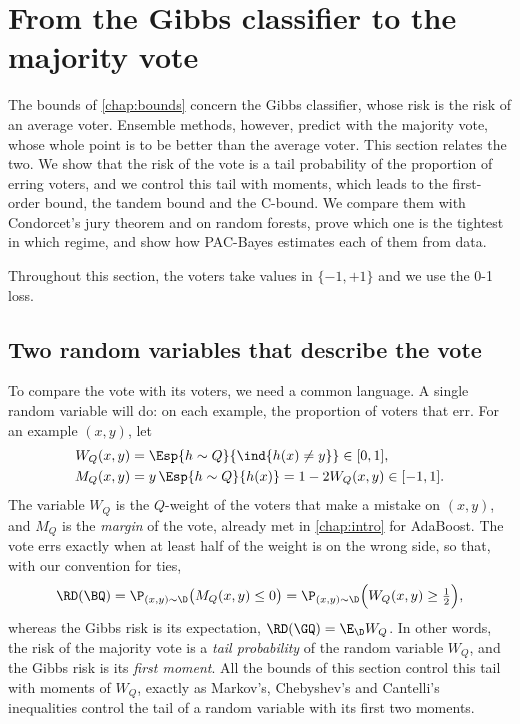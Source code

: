 \section{From the Gibbs classifier to the majority vote}
\label{chap:mv}

\begin{objectives}
The bounds of \cref{chap:bounds} concern the Gibbs classifier, whose risk is the
risk of an average voter. Ensemble methods, however, predict with the majority
vote, whose whole point is to be better than the average voter. This section
relates the two. We show that the risk of the vote is a tail probability of the
proportion of erring voters, and we control this tail with moments, which leads
to the first-order bound, the tandem bound and the C-bound. We compare them with
Condorcet's jury theorem and on random forests, prove which one is the tightest
in which regime, and show how PAC-Bayes estimates each of them from data.
\end{objectives}

Throughout this section, the voters take values in $\{-1,+1\}$ and we use the
0-1 loss.

\subsection{Two random variables that describe the vote}

To compare the vote with its voters, we need a common language. A single
random variable will do: on each example, the proportion of voters that err.
For an example $(x,y)$, let
\begin{align*}
W_Q(x,y)&=\Esp{h\sim Q}{\ind{h(x)\neq y}}\in[0,1],\\
M_Q(x,y)&=y\,\Esp{h\sim Q}{h(x)}=1-2W_Q(x,y)\in[-1,1].
\end{align*}
The variable $W_Q$ is the $Q$-weight of the voters that make a mistake on
$(x,y)$, and $M_Q$ is the \emph{margin} of the vote, already met in
\cref{chap:intro} for AdaBoost. The vote errs exactly when at least half of the
weight is on the wrong side, so that, with our convention for ties,
\begin{equation}\label{eq:mv_risk_W}
\RD(\BQ)=\P_{(x,y)\sim\D}\big(M_Q(x,y)\leq0\big)=\P_{(x,y)\sim\D}\Big(W_Q(x,y)\geq\tfrac12\Big),
\end{equation}
whereas the Gibbs risk is its expectation, $\RD(\GQ)=\E_{\D}W_Q$. In other words,
the risk of the majority vote is a \emph{tail probability} of the random
variable $W_Q$, and the Gibbs risk is its \emph{first moment}. All the bounds of
this section control this tail with moments of $W_Q$, exactly as Markov's,
Chebyshev's and Cantelli's inequalities control the tail of a random variable
with its first two moments.

